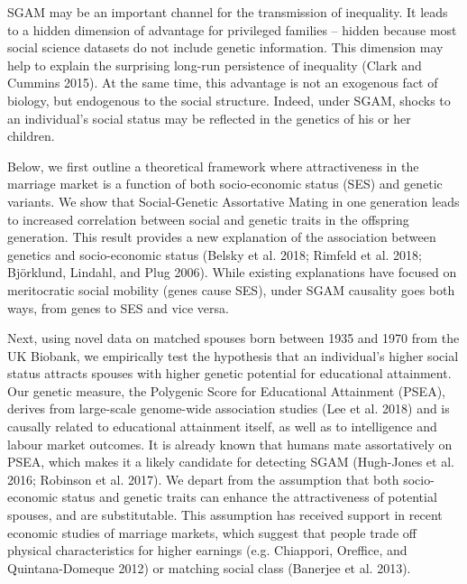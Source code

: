 \documentclass[
]{article}
\begin{document}
SGAM may be an important channel for the transmission of inequality. It leads
to a hidden dimension of advantage for privileged families -- hidden because most
social science datasets do not include genetic information. This dimension may
help to explain the surprising long-run persistence of inequality
(Clark and Cummins 2015). At the same time, this advantage is not an
exogenous fact of biology, but endogenous to the social structure. Indeed, under
SGAM, shocks to an individual's social status may be reflected in the genetics
of his or her children.

Below, we first outline a theoretical framework where attractiveness in the
marriage market is a function of both socio-economic status (SES) and genetic
variants. We show that Social-Genetic Assortative Mating in one generation leads
to increased correlation between social and genetic traits in the offspring
generation. This result provides a new explanation of the association between
genetics and socio-economic status (Belsky et al. 2018; Rimfeld et al. 2018; Björklund, Lindahl, and Plug 2006). While existing explanations have focused on meritocratic
social mobility (genes cause SES), under SGAM causality goes both ways, from
genes to SES and vice versa.

Next, using novel data on matched spouses born between 1935 and 1970 from the UK
Biobank, we empirically test the hypothesis that an individual's higher social
status attracts spouses with higher genetic potential for educational
attainment. Our genetic measure, the Polygenic Score for Educational Attainment
(PSEA), derives from large-scale genome-wide association studies (Lee et al. 2018)
and is causally related to educational attainment itself, as well as to
intelligence and labour market outcomes. It is already known that humans mate
assortatively on PSEA, which makes it a likely candidate for detecting SGAM
(Hugh-Jones et al. 2016; Robinson et al. 2017). We depart from the assumption that
both socio-economic status and genetic traits can enhance the attractiveness of
potential spouses, and are substitutable. This assumption has received support
in recent economic studies of marriage markets, which suggest that people trade
off physical characteristics for higher earnings (e.g. Chiappori, Oreffice, and Quintana-Domeque 2012) or
matching social class (Banerjee et al. 2013).
\end{document}
